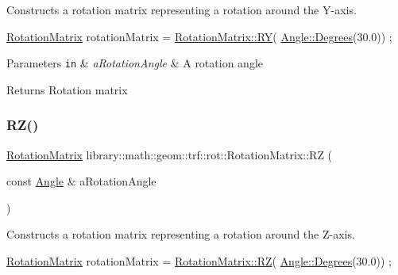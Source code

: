 Constructs a rotation matrix representing a rotation around the Y-\/axis. 


\begin{DoxyCode}
\hyperlink{classlibrary_1_1math_1_1geom_1_1trf_1_1rot_1_1_rotation_matrix_a667d2c05aa5b0cc88775938d11164cdc}{RotationMatrix} rotationMatrix = \hyperlink{classlibrary_1_1math_1_1geom_1_1trf_1_1rot_1_1_rotation_matrix_a165cef74c455c3651bd33cb2a86d2a93}{RotationMatrix::RY}(
      \hyperlink{classlibrary_1_1math_1_1geom_1_1_angle_a64aa53e8420aeb6f671d86c65c370bc8}{Angle::Degrees}(30.0)) ;
\end{DoxyCode}



\begin{DoxyParams}[1]{Parameters}
\mbox{\tt in}  & {\em a\+Rotation\+Angle} & A rotation angle \\
\hline
\end{DoxyParams}
\begin{DoxyReturn}{Returns}
Rotation matrix 
\end{DoxyReturn}
\mbox{\label{classlibrary_1_1math_1_1geom_1_1trf_1_1rot_1_1_rotation_matrix_a357a0cf34802e55ac7221d5d1fd839c9}} 
\subsubsection{\texorpdfstring{R\+Z()}{RZ()}}
{\footnotesize\ttfamily \hyperlink{classlibrary_1_1math_1_1geom_1_1trf_1_1rot_1_1_rotation_matrix}{Rotation\+Matrix} library\+::math\+::geom\+::trf\+::rot\+::\+Rotation\+Matrix\+::\+RZ (\begin{DoxyParamCaption}\item[{const \hyperlink{classlibrary_1_1math_1_1geom_1_1_angle}{Angle} \&}]{a\+Rotation\+Angle }\end{DoxyParamCaption})\hspace{0.3cm}{\ttfamily [static]}}



Constructs a rotation matrix representing a rotation around the Z-\/axis. 


\begin{DoxyCode}
\hyperlink{classlibrary_1_1math_1_1geom_1_1trf_1_1rot_1_1_rotation_matrix_a667d2c05aa5b0cc88775938d11164cdc}{RotationMatrix} rotationMatrix = \hyperlink{classlibrary_1_1math_1_1geom_1_1trf_1_1rot_1_1_rotation_matrix_a357a0cf34802e55ac7221d5d1fd839c9}{RotationMatrix::RZ}(
      \hyperlink{classlibrary_1_1math_1_1geom_1_1_angle_a64aa53e8420aeb6f671d86c65c370bc8}{Angle::Degrees}(30.0)) ;
\end{DoxyCode}



